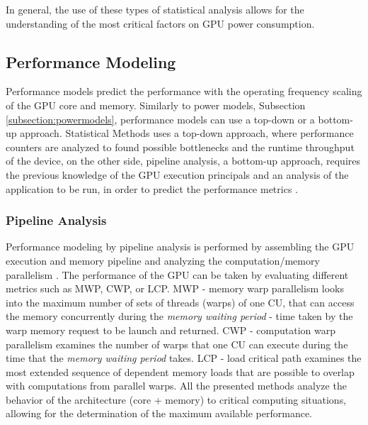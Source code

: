 In general, the use of these types of statistical analysis allows for the understanding of the most critical factors on GPU power consumption.    

\subsection{Performance Modeling}
\label{subsection:performancemodels}

Performance models predict the performance with the operating frequency scaling of the GPU core and memory. Similarly to power models, Subsection \ref{subsection:powermodels}, performance models can use a top-down or a bottom-up approach. Statistical Methods uses a top-down approach, where performance counters are analyzed to found possible bottlenecks and the runtime throughput of the device, on the other side, pipeline analysis, a bottom-up approach, requires the previous knowledge of the GPU execution principals and an analysis of the application to be run, in order to predict the performance metrics \cite{mei_survey_2016}. 

\subsubsection{Pipeline Analysis}
Performance modeling by pipeline analysis is performed by assembling the GPU execution and memory pipeline and analyzing the computation/memory parallelism \cite{mei_survey_2016}. The performance of the GPU can be taken by evaluating different metrics such as MWP, CWP, or LCP. MWP - memory warp parallelism looks into the maximum number of sets of threads (warps) of one CU, that can access the memory concurrently during the \textit{memory waiting period} - time taken by the warp memory request to be launch and returned. CWP - computation warp parallelism examines the number of warps that one CU can execute during the time that the \textit{memory waiting period} takes. LCP - load critical path examines the most extended sequence of dependent memory loads that are possible to overlap with computations from parallel warps. All the presented methods analyze the behavior of the architecture (core + memory) to critical computing situations, allowing for the determination of the maximum available performance.

